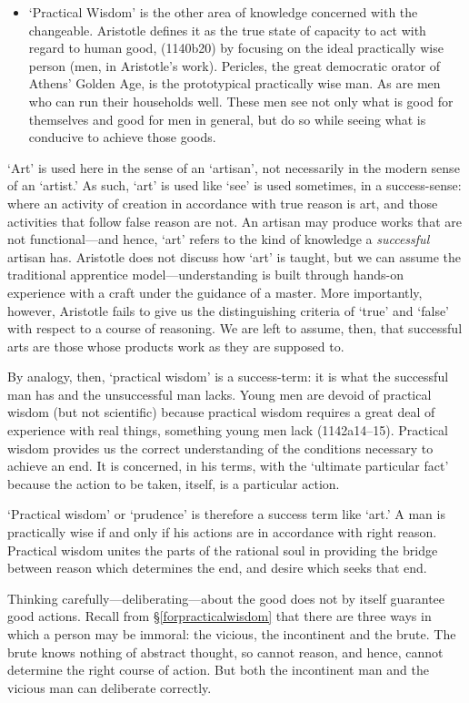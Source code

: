 \begin{itemize}
\item `Practical Wisdom' is the other area of knowledge concerned with the changeable. Aristotle defines it as the true state of capacity to act with regard to human good, (1140b20) by focusing on the ideal practically wise person (men, in Aristotle's work). Pericles, the great democratic orator of Athens' Golden Age, is the prototypical practically wise man. As are men who can run their households well. These men see not only what is good for themselves and good for men in general, but do so while seeing what is conducive to achieve those goods. 

\end{itemize}

`Art' is used here in the sense of an `artisan', not necessarily in the modern sense of an `artist.' As such, `art' is used like `see' is used sometimes, in a success-sense: where an activity of creation in accordance with true reason is art, and those activities that follow false reason are not. An artisan may produce works that are not functional---and hence, `art' refers to the kind of knowledge a \emph{successful} artisan has. Aristotle does not discuss how `art' is taught, but we can assume the traditional apprentice model---understanding is built through hands-on experience with a craft under the guidance of a master. More importantly, however, Aristotle fails to give us the distinguishing criteria of `true' and `false' with respect to a course of reasoning. We are left to assume, then, that successful arts are those whose products work as they are supposed to. 

By analogy, then, `practical wisdom' is a success-term: it is what the successful man has and the unsuccessful man lacks. Young men are devoid of practical wisdom (but not scientific) because practical wisdom requires a great deal of experience with real things, something young men lack (1142a14--15). Practical wisdom provides us the correct understanding of the conditions necessary to achieve an end. It is concerned, in his terms, with the `ultimate particular fact' because the action to be taken, itself, is a particular action. 

`Practical wisdom' or `prudence' is therefore a success term like `art.' A man is practically wise if and only if his actions are in accordance with right reason. Practical wisdom unites the parts of the rational soul in providing the bridge between reason which determines the end, and desire which seeks that end.

Thinking carefully---deliberating---about the good does not by itself guarantee good actions. Recall from \S\ref{forpracticalwisdom} that there are three ways in which a person may be immoral: the vicious, the incontinent and the brute. The brute knows nothing of abstract thought, so cannot reason, and hence, cannot determine the right course of action. But both the incontinent man and the vicious man can deliberate correctly. 

